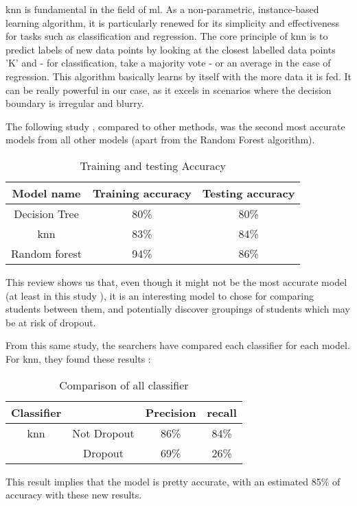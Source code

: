 \documentclass[../../../main.tex]{subfiles}
\begin{document}
\acrfull{knn} is fundamental in the field of \acrshort{ml}. As a non-parametric, instance-based learning algorithm, it is particularly renewed for its simplicity and effectiveness for tasks such as classification and regression.
The core principle of \acrfull{knn} is to predict labels of new data points by looking at the closest labelled data points 'K' and - for classification, take a majority vote - or an average in the case of regression. This algorithm basically learns by itself with the more data it is fed.
It can be really powerful in our case, as it excels in scenarios where the decision boundary is irregular and blurry.

The following study \cite{shiful_machine_2021}, compared to other methods, was the second most accurate models from all other models (apart from the Random Forest algorithm).
\begin{table}[H]
    \centering
    \caption{Training and testing Accuracy\cite{shiful_machine_2021}}
    \begin{tabular}{|c|c|c|}
        \hline
        \textbf{Model name} & \textbf{Training accuracy}  & \textbf{Testing accuracy}\\
        \hline
        Decision Tree & 80\% & 80\% \\
        \hline
        \acrfull{knn} & 83\% & 84\% \\
        \hline
        Random forest & 94\% & 86\% \\
        \hline
    \end{tabular}
    \label{tab:training_testing_acc_shiful}
\end{table}

This review shows us that, even though it  might not be the most accurate model (at least in this study \cite{shiful_machine_2021}), it is an interesting model to chose for comparing students between them, and potentially discover groupings of students which may be at risk of dropout.

From this same study, the searchers have compared each classifier for each model. For \acrshort{knn}, they found these results :
\begin{table}[H]
    \centering
    \caption{Comparison of all classifier\cite{shiful_machine_2021}}
    \begin{tabular}{|c|c|c|c|}
        \hline
        \textbf{Classifier} & & \textbf{Precision} & \textbf{recall}\\
        \hline
        \acrshort{knn} & Not Dropout & 86\% & 84\% \\
        \cline{2-4} 
        & Dropout & 69\% & 26\% \\
        \hline
    \end{tabular}
    \label{tab:compar_classifier_shiful}
\end{table}

This result implies that the model is pretty accurate, with an estimated 85\% of accuracy with these new results.
\end{document}
